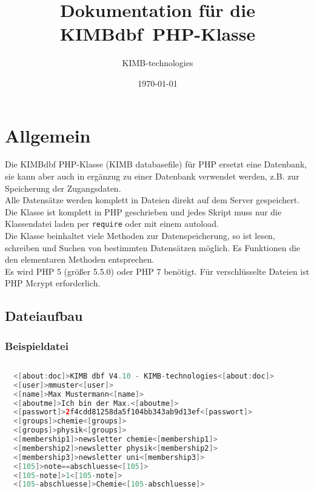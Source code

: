 \documentclass[paper=A4,pagesize=auto,12pt,headinclude=true,footinclude=true,BCOR=0mm,DIV=calc]{scrartcl}
\newcommand{\allgclassname}{KIMBdbf}
\begin{document}
  \title{Dokumentation für die \allgclassname ~PHP-Klasse}
  \author{KIMB-technologies}
  \date{\today}
  \maketitle
  
  \thispagestyle{empty}
  
  \newpage
  \tableofcontents


  \newpage
  \section{Allgemein}
  
  Die KIMBdbf PHP-Klasse (KIMB databasefile) für PHP ersetzt eine Datenbank, sie kann
  aber auch in ergänzug zu einer Datenbank verwendet werden, z.B. zur Speicherung der 
  Zugangsdaten.\\
  Alle Datensätze werden komplett in Dateien direkt auf dem Server gespeichert.
  Die Klasse ist komplett in PHP geschrieben und jedes Skript muss nur die Klassendatei laden
  per \lstinline-require- oder mit einem autoload.\\
  Die Klasse beinhaltet viele Methoden zur Datenspeicherung, so ist lesen, schreiben und Suchen von bestimmten
  Datensätzen möglich. Es Funktionen die den elementaren Methoden entsprechen.\\
  Es wird PHP 5 (größer 5.5.0) oder PHP 7 benötigt. Für verschlüsselte Dateien ist PHP Mcrypt erforderlich.\\
  
  \subsection{Dateiaufbau}
  \subsubsection{Beispieldatei}
  
  \begin{lstlisting}[gobble=2,language=Java]
   
  <[about:doc]>KIMB dbf V4.10 - KIMB-technologies<[about:doc]>
  <[user]>mmuster<[user]>
  <[name]>Max Mustermann<[name]>
  <[aboutme]>Ich bin der Max.<[aboutme]>
  <[passwort]>2f4cdd81258da5f104bb343ab9d13ef<[passwort]>
  <[groups]>chemie<[groups]>
  <[groups]>physik<[groups]>
  <[membership1]>newsletter chemie<[membership1]>
  <[membership2]>newsletter physik<[membership2]>
  <[membership3]>newsletter uni<[membership3]>
  <[105]>note==abschluesse<[105]>
  <[105-note]>1<[105-note]>
  <[105-abschluesse]>Chemie<[105-abschluesse]>
  
  \end{lstlisting}
  
\end{document}
